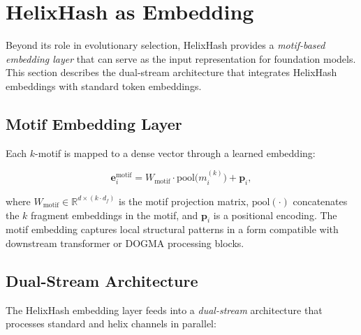 \section{HelixHash as Embedding}
\label{sec:helixhash-embedding}

Beyond its role in evolutionary selection, HelixHash provides a \emph{motif-based embedding layer} that can serve as the input representation for foundation models. This section describes the dual-stream architecture that integrates HelixHash embeddings with standard token embeddings.

\subsection{Motif Embedding Layer}

Each $k$-motif is mapped to a dense vector through a learned embedding:

\begin{equation}
\mathbf{e}_i^{\text{motif}} = W_{\text{motif}} \cdot \mathrm{pool}\bigl(m_i^{(k)}\bigr) + \mathbf{p}_i,
\label{eq:motif-embedding}
\end{equation}

where $W_{\text{motif}} \in \mathbb{R}^{d \times (k \cdot d_f)}$ is the motif projection matrix, $\mathrm{pool}(\cdot)$ concatenates the $k$ fragment embeddings in the motif, and $\mathbf{p}_i$ is a positional encoding. The motif embedding captures local structural patterns in a form compatible with downstream transformer or DOGMA processing blocks.

\subsection{Dual-Stream Architecture}

The HelixHash embedding layer feeds into a \emph{dual-stream} architecture that processes standard and helix channels in parallel:

